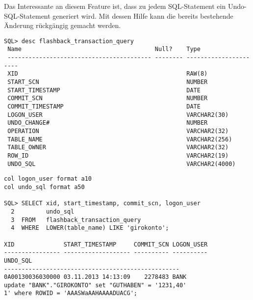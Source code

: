           Das Interessante an diesem Feature ist, dass zu jedem SQL-Statement ein Undo-SQL-Statement generiert wird. Mit dessen Hilfe kann die bereits bestehende Änderung rückgängig gemacht werden.
          \begin{lstlisting}[caption={Die Tabelle \identifier{flashback\_transaction\_query}},label=admin1707,language=oracle_sql,alsolanguage=sqlplus,emph={[9]RAW,NUMBER,DATE,VARCHAR2},emphstyle={[9]\color{black}}]
SQL> desc flashback_transaction_query
 Name                                      Null?    Type
 ----------------------------------------- -------- ----------------------
 XID                                                RAW(8)
 START_SCN                                          NUMBER
 START_TIMESTAMP                                    DATE
 COMMIT_SCN                                         NUMBER
 COMMIT_TIMESTAMP                                   DATE
 LOGON_USER                                         VARCHAR2(30)
 UNDO_CHANGE#                                       NUMBER
 OPERATION                                          VARCHAR2(32)
 TABLE_NAME                                         VARCHAR2(256)
 TABLE_OWNER                                        VARCHAR2(32)
 ROW_ID                                             VARCHAR2(19)
 UNDO_SQL                                           VARCHAR2(4000)
          \end{lstlisting}
\clearpage
          \begin{lstlisting}[caption={Informationsgewinnung mit Flashback Transaction Query},label=admin1708,language=oracle_sql,alsolanguage=sqlplus]
col logon_user format a10
col undo_sql format a50

SQL> SELECT xid, start_timestamp, commit_scn, logon_user
  2         undo_sql
  3  FROM   flashback_transaction_query
  4  WHERE  LOWER(table_name) LIKE 'girokonto';

XID              START_TIMESTAMP     COMMIT_SCN LOGON_USER
---------------- ------------------- ---------- ----------
UNDO_SQL
--------------------------------------------------
0A00130036030000 03.11.2013 14:13:09    2278483 BANK
update "BANK"."GIROKONTO" set "GUTHABEN" = '1231,40'
1' where ROWID = 'AAASWaAAHAAAADUACG';

          \end{lstlisting}

          \begin{literaturinternet}
            \item \cite{ADFNS01005}
          \end{literaturinternet}
